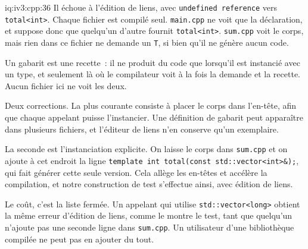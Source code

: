 \begin{solution}{iq:iv3:cpp:36}
Il échoue à l'édition de liens, avec \texttt{undefined reference} vers \texttt{total<int>}. Chaque fichier est compilé seul. \texttt{main.cpp} ne voit que la déclaration, et suppose donc que quelqu'un d'autre fournit \texttt{total<int>}. \texttt{sum.cpp} voit le corps, mais rien dans ce fichier ne demande un \texttt{T}, si bien qu'il ne génère aucun code.

Un gabarit est une recette~: il ne produit du code que lorsqu'il est instancié avec un type, et seulement là où le compilateur voit à la fois la demande et la recette. Aucun fichier ici ne voit les deux.

Deux corrections. La plus courante consiste à placer le corps dans l'en-tête, afin que chaque appelant puisse l'instancier. Une définition de gabarit peut apparaître dans plusieurs fichiers, et l'éditeur de liens n'en conserve qu'un exemplaire.

La seconde est l'instanciation explicite. On laisse le corps dans \texttt{sum.cpp} et on ajoute à cet endroit la ligne \texttt{template int total(const std::vector<int>\&);}, qui fait générer cette seule version. Cela allège les en-têtes et accélère la compilation, et notre construction de test s'effectue ainsi, avec édition de liens.

Le coût, c'est la liste fermée. Un appelant qui utilise \texttt{std::vector<long>} obtient la même erreur d'édition de liens, comme le montre le test, tant que quelqu'un n'ajoute pas une seconde ligne dans \texttt{sum.cpp}. Un utilisateur d'une bibliothèque compilée ne peut pas en ajouter du tout.

\end{solution}

